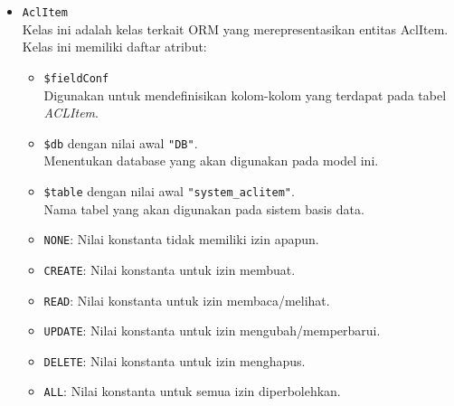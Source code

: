 \begin{itemize}
        \item \texttt{AclItem} \\
            Kelas ini adalah kelas terkait ORM yang merepresentasikan entitas AclItem. Kelas ini
            memiliki daftar atribut:
            \begin{itemize}
                \item \texttt{\$fieldConf} \\
                    Digunakan untuk mendefinisikan kolom-kolom yang terdapat pada tabel \textit{ACLItem}.
                \item \texttt{\$db} dengan nilai awal \texttt{"DB"}. \\
                    Menentukan database yang akan digunakan pada model ini.
                \item \texttt{\$table} dengan nilai awal \texttt{"system\_aclitem"}. \\
                    Nama tabel yang akan digunakan pada sistem basis data. 
                \item \texttt{NONE}: Nilai konstanta tidak memiliki izin apapun.
                \item \texttt{CREATE}: Nilai konstanta untuk izin membuat.
                \item \texttt{READ}: Nilai konstanta untuk izin membaca/melihat.
                \item \texttt{UPDATE}: Nilai konstanta untuk izin mengubah/memperbarui.
                \item \texttt{DELETE}: Nilai konstanta untuk izin menghapus.
                \item \texttt{ALL}: Nilai konstanta untuk semua izin diperbolehkan.
            \end{itemize}
            

\end{itemize}
